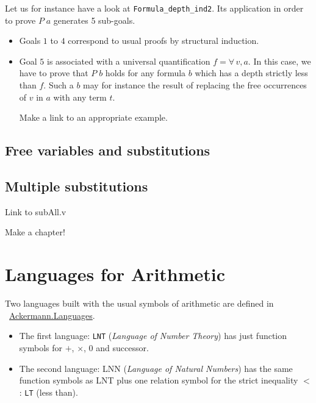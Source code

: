 Let us for instance have a look  at \texttt{Formula\_depth\_ind2}. Its application in order to prove $P\;a$ generates 5 sub-goals. 


\begin{itemize}
\item Goals $1$ to $4$ correspond to  usual proofs by structural induction.
\item Goal $5$ is associated with a universal quantification $f=\forall\,v,a$. In this case, we have to prove that $P\;b$ holds for any formula $b$ which has a depth strictly less than $f$. Such a $b$ may for instance the result of replacing the free occurrences of $v$ in $a$ with any term $t$.
  \begin{todo}
   Make a link to an appropriate example.
  \end{todo}
\end{itemize}



\subsection{Free variables and substitutions}



\subsection{Multiple substitutions}

\begin{todo}
Link to subAll.v
\end{todo}

\begin{todo}
Make a chapter!
\end{todo}
\section{Languages for Arithmetic}



Two languages built with the usual symbols of arithmetic are 
defined in ~\href{../theories/html/hydras.Ackermann.Languages.html}{Ackermann.Languages}.

\begin{itemize}
\item The first language: \texttt{LNT} (\emph{Language of Number Theory}) has just function symbols for $+$, $\times$, $0$ and successor.
\item The second language: LNN (\emph{Language of Natural Numbers})  has
the same function symbols as LNT plus one relation symbol for the strict inequality $<$ : \texttt{LT} (less than).
\end{itemize}

